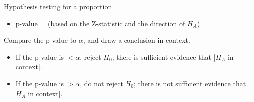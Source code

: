 \begin{onebox}{Hypothesis testing for a proportion}
\begin{itemize}
\begin{itemize}
\item[] point estimate: the sample proportion $\hat{p}$
\item[] $SE$ of estimate:  $\sqrt{\frac{\ p_0(1-p_0)\ }{n}}$
\item[] null value: $p_0$
\end{itemize}
\item[] p-value = (based on the Z-statistic and the direction of $H_A$)
\end{itemize}
  Compare the p-value to $\alpha$, and draw a conclusion in context.  \vspace{-1mm}
\begin{itemize}
\item[] If the p-value is $< \alpha$, reject $H_0$; there is sufficient evidence that [$H_A$ in context]. 
\item[] If the p-value is $> \alpha$, do not reject $H_0$; there is not sufficient evidence that [$H_A$ in context].
\end{itemize}\end{onebox}


